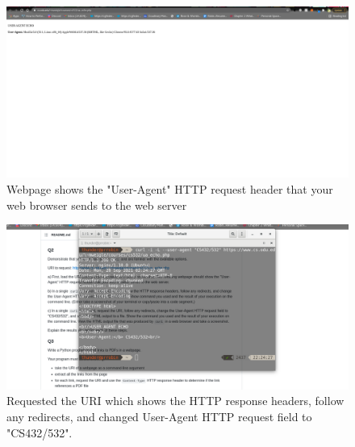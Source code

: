 \documentclass[12pt]{article}
\begin{document}
\begin{figure}
    \centering
    \includegraphics[trim=0 20 10 50, clip, width=\textwidth] {Q2_1.png}
    \caption{Webpage shows the "User-Agent" HTTP request header that your web browser sends to the web server}
    \label{fig:web-growth}
\end{figure}

\begin{figure}
    \centering
    \includegraphics[trim=0 20 10 50, clip, width=\textwidth] {Q2_2.png}
    \caption{Requested the URI which shows the HTTP response headers, follow any redirects, and changed User-Agent HTTP request field to "CS432/532".}
    \label{fig:web-growth}
\end{figure}
\end{document}
